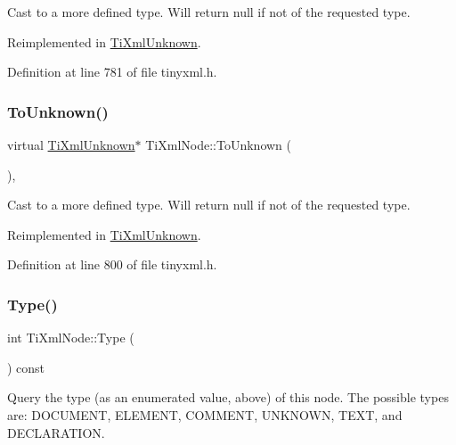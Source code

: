 Cast to a more defined type. Will return null if not of the requested type. 



Reimplemented in \hyperlink{class_ti_xml_unknown_a0d08dc16fc9ce16140ccaefbc35f6ea6}{Ti\+Xml\+Unknown}.



Definition at line 781 of file tinyxml.\+h.

\hypertarget{class_ti_xml_node_a06de5af852668c7e4af0d09c205f0b0d}{}\label{class_ti_xml_node_a06de5af852668c7e4af0d09c205f0b0d} 
\subsubsection{\texorpdfstring{To\+Unknown()}{ToUnknown()}\hspace{0.1cm}{\footnotesize\ttfamily [2/2]}}
{\footnotesize\ttfamily virtual \hyperlink{class_ti_xml_unknown}{Ti\+Xml\+Unknown}$\ast$ Ti\+Xml\+Node\+::\+To\+Unknown (\begin{DoxyParamCaption}{ }\end{DoxyParamCaption})\hspace{0.3cm}{\ttfamily [inline]}, {\ttfamily [virtual]}}



Cast to a more defined type. Will return null if not of the requested type. 



Reimplemented in \hyperlink{class_ti_xml_unknown_a67c9fd22940e8c47f706a72cdd2e332c}{Ti\+Xml\+Unknown}.



Definition at line 800 of file tinyxml.\+h.

\hypertarget{class_ti_xml_node_a0f4dd916b2afc2ab2f1a84f3e2b8fd5d}{}\label{class_ti_xml_node_a0f4dd916b2afc2ab2f1a84f3e2b8fd5d} 
\subsubsection{\texorpdfstring{Type()}{Type()}}
{\footnotesize\ttfamily int Ti\+Xml\+Node\+::\+Type (\begin{DoxyParamCaption}{ }\end{DoxyParamCaption}) const\hspace{0.3cm}{\ttfamily [inline]}}

Query the type (as an enumerated value, above) of this node. The possible types are\+: D\+O\+C\+U\+M\+E\+NT, E\+L\+E\+M\+E\+NT, C\+O\+M\+M\+E\+NT, U\+N\+K\+N\+O\+WN, T\+E\+XT, and D\+E\+C\+L\+A\+R\+A\+T\+I\+ON. 

